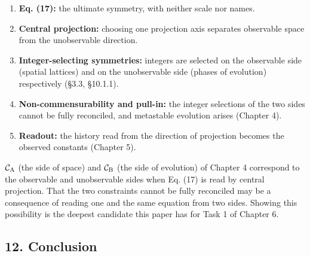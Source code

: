 \documentclass[
  a4paper,
]{article}
\providecommand{\tightlist}{%
  \setlength{\itemsep}{0pt}\setlength{\parskip}{0pt}}
\begin{document}
\begin{enumerate}
\def\labelenumi{\arabic{enumi}.}
\tightlist
\item
  \textbf{Eq. (17):} the ultimate symmetry, with neither scale nor
  names.
\item
  \textbf{Central projection:} choosing one projection axis separates
  observable space from the unobservable direction.
\item
  \textbf{Integer-selecting symmetries:} integers are selected on the
  observable side (spatial lattices) and on the unobservable side
  (phases of evolution) respectively (§3.3, §10.1.1).
\item
  \textbf{Non-commensurability and pull-in:} the integer selections of
  the two sides cannot be fully reconciled, and metastable evolution
  arises (Chapter 4).
\item
  \textbf{Readout:} the history read from the direction of projection
  becomes the observed constants (Chapter 5).
\end{enumerate}

\(\mathcal C_{\rm A}\) (the side of space) and \(\mathcal C_{\rm B}\)
(the side of evolution) of Chapter 4 correspond to the observable and
unobservable sides when Eq. (17) is read by central projection. That the
two constraints cannot be fully reconciled may be a consequence of
reading one and the same equation from two sides. Showing this
possibility is the deepest candidate this paper has for Task 1 of
Chapter 6.

\subsection{12. Conclusion}\label{conclusion}
\end{document}
